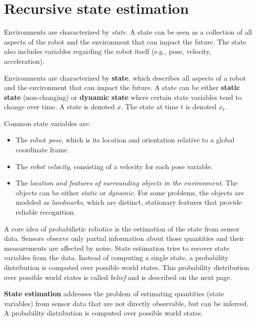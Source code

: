 \section{Recursive state estimation}
\label{sec:background-recursive-state-estimation}
Environments are characterized by \textit{state}.
A state can be seen as a collection of all aspects of the robot and the environment that can impact the future.
The state also includes variables regarding the robot itself (e.g., pose, velocity, acceleration).
\begin{mydef}
Environments are characterized by \textbf{state}, which describes all aspects of a robot and the environment that can impact the future.
A state can be either \textbf{static state} (non-changing) or \textbf{dynamic state} where certain state variables tend to change over time.
A state is denoted $x$.
The state at time $t$ is denoted $x_t$.
\end{mydef}
Common state variables are:
\begin{itemize}
\item The robot \textit{pose}, which is its location and orientation relative to a global coordinate frame.
\item The \textit{robot velocity}, consisting of a velocity for each pose variable.%
\item The \textit{location and features of surrounding objects in the environment}. The objects can be either \textit{static} or \textit{dynamic}. For some problems, the objects are modeled as \textit{landmarks}, which are distinct, stationary features that provide reliable recognition.
\end{itemize}

A core idea of probabilistic robotics is the estimation of the state from sensor data.
Sensors observe only partial information about those quantities and their measurements are affected by noise. 
State estimation tries to recover state variables from the data.
Instead of computing a single state, a probability distribution is computed over possible world states.
This probability distribution over possible world states is called \textit{belief} and is described on the next page.
\begin{mydef}
\textbf{State estimation} addresses the problem of estimating quantities (state variables) from sensor data that are not directly observable, but can be inferred.
A probability distribution is computed over possible world states.
\end{mydef}

